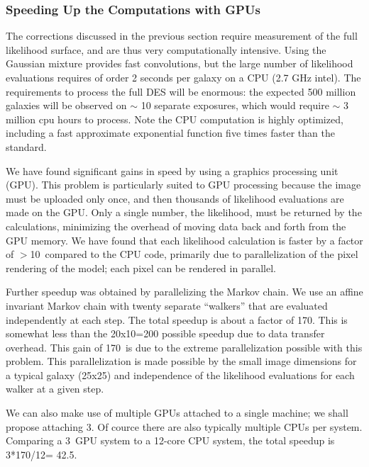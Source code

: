 \documentclass[12pt]{article}
\newcommand{\speedupnum}{10}
\newcommand{\ncpus}{12}
\newcommand{\speedupcpu}{42.5}
\newcommand{\overallspeedup}{170}
\newcommand{\ngpus}{3}
\begin{document}
\subsubsection{Speeding Up the Computations with GPUs} \label{sec:gmix:gpu}

The corrections discussed in the previous section require measurement of the
full likelihood surface, and are thus very computationally intensive.  Using
the Gaussian mixture provides fast convolutions, but the large number of
likelihood evaluations requires of order 2 seconds per galaxy on a CPU (2.7 GHz
intel). The requirements to process the full DES will be enormous: the expected
500 million galaxies will be observed on $\sim$ 10 separate exposures, which
would require $\sim$ 3 million cpu hours to process. Note the CPU computation
is highly optimized, including a fast approximate exponential function five
times faster than the standard. 

We have found significant gains in speed by using a graphics processing unit
(GPU).  This problem is particularly suited to GPU processing because the image
must be uploaded only once, and then thousands of likelihood evaluations are
made on the GPU. Only a single number, the likelihood, must be returned by the
calculations, minimizing the overhead of moving data back and forth from the
GPU memory.  We have found that each likelihood calculation is faster by a
factor of $>$\speedupnum\ compared to the CPU code, primarily due to
parallelization of the pixel rendering of the model; each pixel can be rendered
in parallel.

Further speedup was obtained by parallelizing the Markov chain.  We use an
affine invariant Markov chain\cite{GoodmanWeare10} with twenty separate
``walkers'' that are evaluated independently at each step.  The total speedup
is about a factor of \overallspeedup.  This is somewhat less than the 20x10=200
possible speedup due to data transfer overhead.  This gain of \overallspeedup\
is due to the extreme parallelization possible with this problem.  This
parallelization is made possible by the small image dimensions for a typical
galaxy (25x25) and independence of the likelihood evaluations for each walker
at a given step.

We can also make use of multiple GPUs attached to a single machine; we shall
propose attaching \ngpus.  Of cource there are also typically multiple CPUs per
system.  Comparing a \ngpus\ GPU system to a \ncpus-core CPU system, the total
speedup is \ngpus*\overallspeedup/\ncpus = \speedupcpu.
\end{document}
